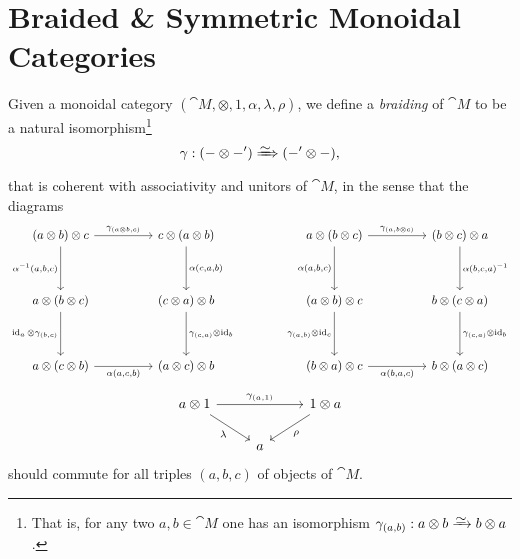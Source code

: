 \documentclass[../../deep-dive]{subfiles}
\begin{document}
\section{Braided \& Symmetric Monoidal Categories}

\begin{definition}[Braiding]
\label{def:braiding}
Given a monoidal category \((\cat M, \otimes, 1, \alpha, \lambda, \rho)\), we
define a \emph{braiding} of \(\cat M\) to be a natural isomorphism\footnote{That
  is, for any two \(a, b \in \cat M\) one has an isomorphism
  \(\gamma_{(a, b)}: a \otimes b \isoto b \otimes a\).}
\[
\gamma: (- \otimes -') \isonat (-' \otimes -),
\]
that is coherent with associativity and unitors of \(\cat M\), in the sense that
the diagrams
\[
\begin{tikzcd}
(a \otimes b) \otimes c
\ar[rr, "\gamma_{(a \otimes b, c)}"]
\ar[dd, "{\alpha^{-1}(a, b, c)}"']
&&c \otimes (a \otimes b)
\ar[dd, "{\alpha(c, a, b)}"]
\\
&&
\\
a \otimes (b \otimes c)
\ar[dd, "\Id_a \otimes \gamma_{(b, c)}"']
&&(c \otimes a) \otimes b
\ar[dd, "\gamma_{(c, a)} \otimes \Id_b"]
\\
&&
\\
a \otimes (c \otimes b)
\ar[rr, "\alpha{(a, c, b)}"']
&&(a \otimes c) \otimes b
\end{tikzcd}
\qquad
\qquad
\begin{tikzcd}
a \otimes (b \otimes c)
\ar[rr, "\gamma_{(a, b \otimes c)}"]
\ar[dd, "{\alpha(a, b, c)}"']
&&(b \otimes c) \otimes a
\ar[dd, "{\alpha(b, c, a)^{-1}}"]
\\
&&
\\
(a \otimes b) \otimes c
\ar[dd, "\gamma_{(a, b)} \otimes \Id_c"']
&&b \otimes (c \otimes a)
\ar[dd, "\gamma_{(c, a)} \otimes \Id_b"]
\\
&&
\\
(b \otimes a) \otimes c
\ar[rr, "\alpha{(b, a, c)}"']
&&b \otimes (a \otimes c)
\end{tikzcd}
\]
\[
\begin{tikzcd}
a \otimes 1 \ar[rr, "\gamma_{(a, 1)}"]
\ar[rd, "\lambda"']
&&1 \otimes a \ar[ld, "\rho"]
\\
&a &
\end{tikzcd}
\]
should commute for all triples \((a, b, c)\) of objects of \(\cat M\).
\end{definition}

\end{document}
